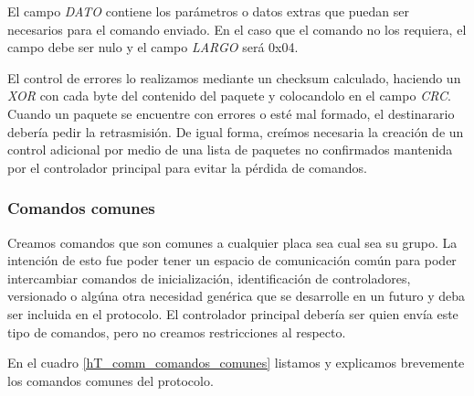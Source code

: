 El campo \emph{DATO} contiene los par\'ametros o datos extras que puedan ser necesarios para el comando enviado.
En el caso que el comando no los requiera, el campo debe ser nulo y el campo \emph{LARGO} ser\'a 0x04.

El control de errores lo realizamos mediante un checksum calculado, haciendo un \emph{XOR} con cada byte del contenido del paquete
y colocandolo en el campo \emph{CRC}.
Cuando un paquete se encuentre con errores o est\'e mal formado, el destinarario deber\'ia pedir la retrasmisi\'on.
De igual forma, cre\'imos necesaria la creaci\'on de un control adicional por medio de una lista de paquetes no confirmados mantenida
por el controlador principal para evitar la p\'erdida de comandos.

\subsubsection{Comandos comunes}
\label{h_comm_protocolo_comandosComunes}

Creamos comandos que son comunes a cualquier placa sea cual sea su grupo.
La intenci\'on de esto fue poder tener un espacio de comunicaci\'on com\'un para poder intercambiar comandos
de inicializaci\'on, identificaci\'on de controladores, versionado o alg\'una otra necesidad gen\'erica que
se desarrolle en un futuro y deba ser incluida en el protocolo.
El controlador principal deber\'ia ser quien env\'ia este tipo de comandos, pero no creamos restricciones al respecto.

En el cuadro \ref{hT_comm_comandos_comunes} listamos y explicamos brevemente los comandos comunes del protocolo.

